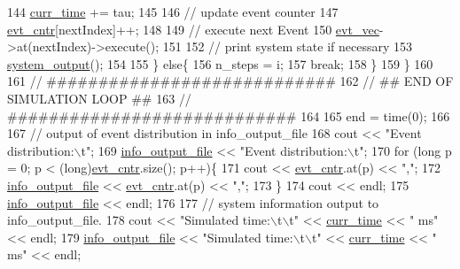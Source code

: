 \begin{DoxyCode}
144                 \hyperlink{classnw_1_1_gillespie___sys_ac83bb4eaee1f8b46610a8243a83fb3ad}{curr\_time} += tau;
145 
146 \textcolor{comment}{//              update event counter}
147                 \hyperlink{classnw_1_1_gillespie___sys_a98aa1c6ddc1cd3307882ef3bbf646e6a}{evt\_cntr}[nextIndex]++;
148 
149 \textcolor{comment}{//              execute next Event}
150                 \hyperlink{classnw_1_1_gillespie___sys_a3f9b4464bed7135f51413c57f086aef7}{evt\_vec}->at(nextIndex)->execute();
151 
152 \textcolor{comment}{//              print system state if necessary}
153                 \hyperlink{classnw_1_1_gillespie___sys_a48bc0eec3fc239802276ea1499326352}{system\_output}();
154 
155             \} \textcolor{keywordflow}{else}\{
156                 n\_steps = i;
157                 \textcolor{keywordflow}{break};
158             \}
159         \}
160 
161 \textcolor{comment}{//      ############################}
162 \textcolor{comment}{//      ## END OF SIMULATION LOOP ##}
163 \textcolor{comment}{//      ############################}
164 
165         end = time(0);
166 
167 \textcolor{comment}{//      output of event distribution in info\_output\_file}
168         cout << \textcolor{stringliteral}{"Event distribution:\(\backslash\)t"};
169         \hyperlink{classnw_1_1_gillespie___sys_a1137e63fe12d34f81110bf5e8ebe856c}{info\_output\_file} << \textcolor{stringliteral}{"Event distribution:\(\backslash\)t"};
170         \textcolor{keywordflow}{for} (\textcolor{keywordtype}{long} p = 0; p < (long)\hyperlink{classnw_1_1_gillespie___sys_a98aa1c6ddc1cd3307882ef3bbf646e6a}{evt\_cntr}.size(); p++)\{
171             cout << \hyperlink{classnw_1_1_gillespie___sys_a98aa1c6ddc1cd3307882ef3bbf646e6a}{evt\_cntr}.at(p) << \textcolor{stringliteral}{","};
172             \hyperlink{classnw_1_1_gillespie___sys_a1137e63fe12d34f81110bf5e8ebe856c}{info\_output\_file} << \hyperlink{classnw_1_1_gillespie___sys_a98aa1c6ddc1cd3307882ef3bbf646e6a}{evt\_cntr}.at(p) << \textcolor{stringliteral}{","};
173         \}
174         cout << endl;
175         \hyperlink{classnw_1_1_gillespie___sys_a1137e63fe12d34f81110bf5e8ebe856c}{info\_output\_file} << endl;
176 
177 \textcolor{comment}{//      system information output to info\_output\_file.}
178         cout << \textcolor{stringliteral}{"Simulated time:\(\backslash\)t\(\backslash\)t"} << \hyperlink{classnw_1_1_gillespie___sys_ac83bb4eaee1f8b46610a8243a83fb3ad}{curr\_time} << \textcolor{stringliteral}{" ms"} << endl;
179         \hyperlink{classnw_1_1_gillespie___sys_a1137e63fe12d34f81110bf5e8ebe856c}{info\_output\_file} << \textcolor{stringliteral}{"Simulated time:\(\backslash\)t\(\backslash\)t"} << \hyperlink{classnw_1_1_gillespie___sys_ac83bb4eaee1f8b46610a8243a83fb3ad}{curr\_time} << \textcolor{stringliteral}{" ms"} << endl;

\end{DoxyCode}
